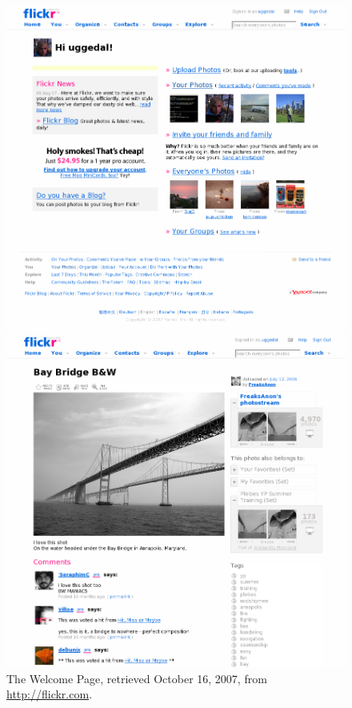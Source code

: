 \begin{figure}[b]
  \captionstyle{\raggedright}
  \begin{whole}
    \begin{minipage}[t]{0.475\wholewidth}
      \includegraphics[width=\textwidth]{scrsh_flickr_welcome}
      \caption[Flickr Welcome Page]{%
         The Welcome Page,
         retrieved October 16, 2007, from \url{http://flickr.com}.}
      \label{figure:scrsh.flickr.welcome}
    \end{minipage}
    \hfill
    \begin{minipage}[t]{0.475\wholewidth}
      \includegraphics[width=\textwidth]{scrsh_flickr_photo_detail}

\end{minipage}
\end{whole}
\end{figure}
